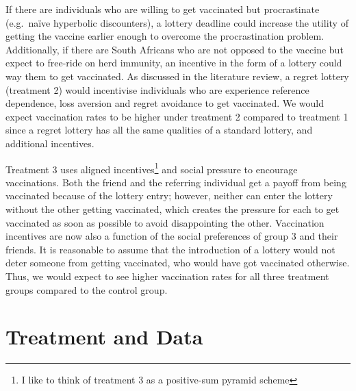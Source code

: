 \documentclass[11pt,preprint, authoryear]{elsarticle}
\numberwithin{equation}{section}
\numberwithin{figure}{section}
\numberwithin{table}{section}
\let\rmarkdownfootnote\footnote%
\def\footnote{\protect\rmarkdownfootnote}
\begin{document}
If there are individuals who are willing to get vaccinated but
procrastinate (e.g.~naïve hyperbolic discounters), a lottery deadline
could increase the utility of getting the vaccine earlier enough to
overcome the procrastination problem. Additionally, if there are South
Africans who are not opposed to the vaccine but expect to free-ride on
herd immunity, an incentive in the form of a lottery could way them to
get vaccinated. As discussed in the literature review, a regret lottery
(treatment 2) would incentivise individuals who are experience reference
dependence, loss aversion and regret avoidance to get vaccinated. We
would expect vaccination rates to be higher under treatment 2 compared
to treatment 1 since a regret lottery has all the same qualities of a
standard lottery, and additional incentives.

Treatment 3 uses aligned incentives\footnote{I like to think of
  treatment 3 as a positive-sum pyramid scheme} and social pressure to
encourage vaccinations. Both the friend and the referring individual get
a payoff from being vaccinated because of the lottery entry; however,
neither can enter the lottery without the other getting vaccinated,
which creates the pressure for each to get vaccinated as soon as
possible to avoid disappointing the other. Vaccination incentives are
now also a function of the social preferences of group 3 and their
friends. It is reasonable to assume that the introduction of a lottery
would not deter someone from getting vaccinated, who would have got
vaccinated otherwise. Thus, we would expect to see higher vaccination
rates for all three treatment groups compared to the control group.

\hypertarget{treatment-and-data}{%
\section{\texorpdfstring{Treatment and Data
\label{treatment}}{Treatment and Data }}\label{treatment-and-data}}
\end{document}
